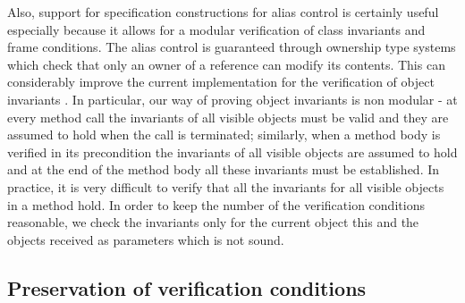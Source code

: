 Also, support for specification constructions for alias control is certainly useful  especially because it allows for a modular verification 
of class invariants and frame conditions.
The alias control is guaranteed through ownership type systems which check that only an owner of a reference can modify its contents.
 This can considerably improve the current implementation for the verification of object invariants  \cite{DietlMueller05}.
In particular, our way of proving object invariants is non modular - at every method call the invariants of all visible 
objects must be valid and they are assumed to hold when the call is terminated; similarly, when a method body is verified in its precondition the invariants of all visible
objects are assumed to hold and at the end of the method body all these invariants must be established. 
In practice, it is very difficult to verify that all the invariants for  all visible objects in a method  hold.
In order to keep the number of the verification conditions reasonable, we check the invariants only for the current object this and the 
objects received as parameters which is not sound.

 
\subsection{Preservation of verification conditions}

